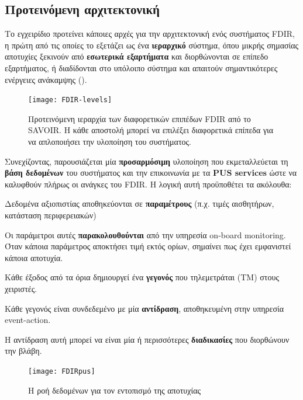 \documentclass[a4paper,nobib]{tufte-book}
\begin{document}
\subsection{Προτεινόμενη αρχιτεκτονική}

Το εγχειρίδιο προτείνει κάποιες αρχές για την αρχιτεκτονική ενός συστήματος \acs{FDIR}, η πρώτη από τις οποίες το εξετάζει ως ένα \textbf{ιεραρχικό} σύστημα, όπου μικρής σημασίας αποτυχίες ξεκινούν από \textbf{εσωτερικά εξαρτήματα} και διορθώνονται σε επίπεδο εξαρτήματος, ή διαδίδονται στο υπόλοιπο σύστημα και απαιτούν σημαντικότερες ενέργειες ανάκαμψης ().

\begin{figure}
	\texttt{[image: FDIR-levels]}
	\caption[Προτεινόμενη ιεραρχία των διαφορετικών επιπέδων FDIR από το SAVOIR]{Προτεινόμενη ιεραρχία των διαφορετικών επιπέδων \acs{FDIR} από το \acs{SAVOIR}. Η κάθε αποστολή μπορεί να επιλέξει διαφορετικά επίπεδα για να απλοποιήσει την υλοποίηση του συστήματος.}
	\label{fig:FDIR-levels}
\end{figure}

Συνεχίζοντας, παρουσιάζεται μία \textbf{προσαρμόσιμη} υλοποίηση που εκμεταλλεύεται τη \textbf{βάση δεδομένων} του συστήματος και την επικοινωνία με τα \textbf{\acs{PUS} services} ώστε να καλυφθούν πλήρως οι ανάγκες του \acs{FDIR}. Η λογική αυτή προϋποθέτει τα ακόλουθα:
\begin{compactenum}
	\item Δεδομένα αξιοπιστίας αποθηκεύονται σε \textbf{παραμέτρους} (π.χ. τιμές αισθητήρων, κατάσταση περιφερειακών)
	\item Οι παράμετροι αυτές \textbf{παρακολουθούνται} από την υπηρεσία on-board monitoring. Όταν κάποια παράμετρος αποκτήσει τιμή εκτός ορίων, σημαίνει πως έχει εμφανιστεί κάποια αποτυχία.
	\item Κάθε έξοδος από τα όρια δημιουργεί ένα \textbf{γεγονός} που τηλεμετράται (\acs{TM}) στους χειριστές.
	\item Κάθε γεγονός είναι συνδεδεμένο με μία \textbf{αντίδραση}, αποθηκευμένη στην υπηρεσία event-action.
	\item Η αντίδραση αυτή μπορεί να είναι μία ή περισσότερες \textbf{διαδικασίες} που διορθώνουν την βλάβη.
\end{compactenum}

\begin{figure}[h]
	\texttt{[image: FDIRpus]}
	\caption{Η ροή δεδομένων για τον εντοπισμό της αποτυχίας}
	\label{fig:fdirpus}
\end{figure}
\end{document}
